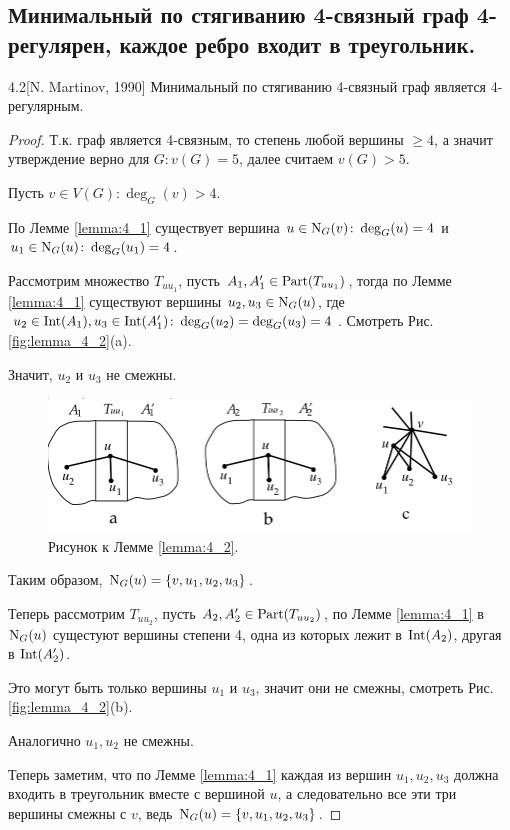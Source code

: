 \subsection{Минимальный по стягиванию 4-связный граф 4-регулярен, каждое ребро входит в треугольник.}

\begin{customlm}{4.2}[N. Martinov, 1990] \label{lemma:4_2}
	Минимальный по стягиванию 4-связный граф является 4-регулярным.
\end{customlm}

\begin{proof}
	Т.к. граф является 4-связным, то степень любой вершины $\geqslant 4$, а значит утверждение верно для  $G \colon v(G) = 5$, далее считаем  $v(G) > 5$.

	Пусть $v \in V(G) \colon \deg_G(v) > 4$.

	По Лемме \ref{lemma:4_1} существует вершина $u \in \operatorname{N}_G(v) \colon \deg_G(u) = 4$ и  $u_1 \in \operatorname{N}_G(u) \colon \deg_G(u_1) = 4$.

	Рассмотрим множество $T_{u u_1}$, пусть $A_1, A_1' \in \operatorname{Part}(T_{uu_1})$, тогда по Лемме \ref{lemma:4_1} существуют вершины $u_2, u_3 \in \operatorname{N}_G(u)$, где $u_2 \in \operatorname{Int}(A_1), u_3 \in \operatorname{Int}(A_1') \colon \deg_G(u_2) = \deg_G(u_3) = 4$. Смотреть Рис. \eqref{fig:lemma_4_2}(a).

	Значит, $u_2$ и $u_3$ не смежны.

	\begin{figure}[ht]
    \centering
	\includegraphics[width=0.6\columnwidth]{figures/lemma_4_2.png}
	\caption{Рисунок к Лемме \ref{lemma:4_2}.}
    \label{fig:lemma_4_2}
	\end{figure}

	Таким образом, $\operatorname{N}_G(u) = \{v, u_1, u_2, u_3\}$.

	Теперь рассмотрим $T_{uu_2}$, пусть $A_2, A_2' \in \operatorname{Part}(T_{uu_2})$, по Лемме \ref{lemma:4_1} в $\operatorname{N}_G(u)$ сущестуют вершины степени 4, одна из которых лежит в  $\operatorname{Int}(A_2)$, другая в $\operatorname{Int}(A_2')$.

	Это могут быть только вершины $u_1$ и $u_3$, значит они не смежны, смотреть Рис. \eqref{fig:lemma_4_2}(b).

	Аналогично $u_1, u_2$ не смежны.

	Теперь заметим, что по Лемме \ref{lemma:4_1} каждая из вершин $u_1, u_2, u_3$ должна входить в треугольник вместе с вершиной $u$, а следовательно все эти три вершины смежны с  $v$, ведь $\operatorname{N}_G(u) = \{v, u_1, u_2, u_3\}$.


\end{proof}
